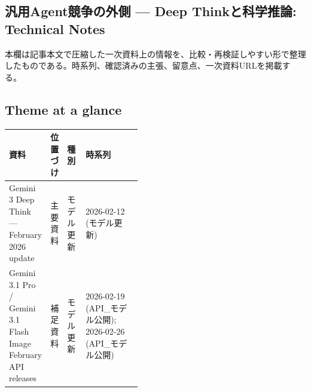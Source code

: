 \subsection*{汎用Agent競争の外側 — Deep Thinkと科学推論: Technical Notes}
本欄は記事本文で圧縮した一次資料上の情報を、比較・再検証しやすい形で整理したものである。時系列、確認済みの主張、留意点、一次資料URLを掲載する。
\medskip
\subsection*{Theme at a glance}
\begin{center}
\footnotesize
\begin{tabularx}{\linewidth}{@{}p{0.20\linewidth}p{0.10\linewidth}p{0.14\linewidth}X@{}}
\toprule
資料 & 位置づけ & 種別 & 時系列 \\
\midrule
Gemini 3 Deep Think — February 2026 update & 主要資料 & モデル更新 & 2026-02-12 (モデル更新) \\
Gemini 3.1 Pro / Gemini 3.1 Flash Image February API releases & 補足資料 & モデル更新 & 2026-02-19 (API\_モデル公開); 2026-02-26 (API\_モデル公開) \\
\bottomrule
\end{tabularx}
\end{center}
\normalsize

